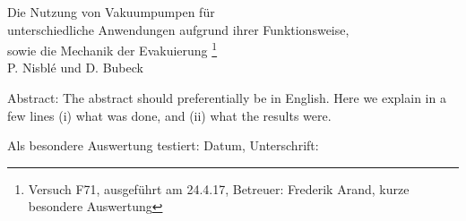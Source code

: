 \documentclass[12pt, a4paper]{scrartcl}
\begin{document}
	
	\thispagestyle{empty}
	\null\vspace{40mm}
	\begin{center}
		{
			\Large  Die Nutzung von Vakuumpumpen für\\ unterschiedliche Anwendungen aufgrund ihrer Funktionsweise,\\ 
			sowie die Mechanik der Evakuierung	
			\footnote{
				\noindent Versuch F71, ausgeführt am 24.4.17,
				Betreuer: Frederik Arand,
				kurze besondere Auswertung
			}
		}\\[15mm]
		P. Nisblé und D. Bubeck
		
		\vspace{25mm}
		
		\parbox{0.9\textwidth}{
			Abstract:    
			\small The abstract should preferentially be in English. Here we explain in a
			few lines (i) what was done, and (ii) what the results were.
		}
	\end{center}
	
	\vfill
	Als besondere Auswertung testiert: Datum, Unterschrift:
	\vspace{20mm}
	
	\newpage  
	\null\thispagestyle{empty} 
	
	
	\newpage
	
\end{document}
